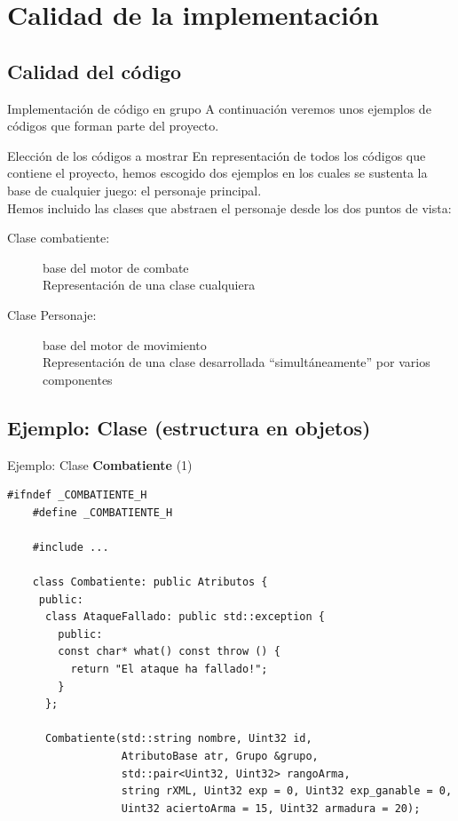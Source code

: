 \documentclass[9pt,xcolor=svgnames]{beamer}
\begin{document}
 \section{Calidad de la implementación}
 
  \subsection{Calidad del código}
  
  \begin{frame}{Implementación de código en grupo}
   A continuación veremos unos ejemplos de códigos que forman parte del
   proyecto.

   \begin{block}{Elección de los códigos a mostrar}
    En representación de todos los códigos que contiene el proyecto,
    hemos escogido dos ejemplos en los cuales se sustenta la base de
    cualquier juego: el personaje principal.\\

    \vspace*{0.3cm}    
    Hemos incluido las clases que abstraen el personaje desde los dos
    puntos de vista:
    \begin{description}
     \item[Clase combatiente:] base del motor de combate\\
		Representación de una clase cualquiera
     \item[Clase Personaje:] base del motor de movimiento\\
		Representación de una clase desarrollada
		``simultáneamente'' por varios componentes
    \end{description}
   \end{block}
  \end{frame}
 
  \subsection{Ejemplo: Clase (estructura en objetos)}
  
  
  \begin{frame}[fragile=singleslide]{Ejemplo: Clase \textbf{Combatiente} (1)}
   
   \begin{lstlisting}[style=C++]
    #ifndef _COMBATIENTE_H
    #define _COMBATIENTE_H
    
    #include ...

    class Combatiente: public Atributos {
     public:
      class AtaqueFallado: public std::exception {
        public:
        const char* what() const throw () {
          return "El ataque ha fallado!";
        }
      };

      Combatiente(std::string nombre, Uint32 id,
                  AtributoBase atr, Grupo &grupo,
                  std::pair<Uint32, Uint32> rangoArma,
                  string rXML, Uint32 exp = 0, Uint32 exp_ganable = 0, 
                  Uint32 aciertoArma = 15, Uint32 armadura = 20);
   \end{lstlisting}
    
  \end{frame}
    
\end{document}
